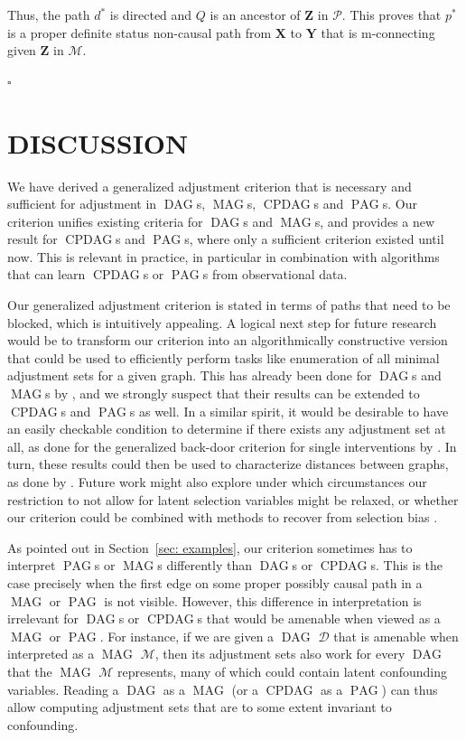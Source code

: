 \documentclass[]{article}
\DeclareMathOperator{\CPDAG}{CPDAG}
\DeclareMathOperator{\DAG}{DAG}
\DeclareMathOperator{\MAG}{MAG}
\DeclareMathOperator{\PAG}{PAG}
\theoremstyle{definition}
\newenvironment{proofof}[1][]{\begin{trivlist}
   \item[\hskip \labelsep {\bfseries Proof of #1.}]}{\end{trivlist} \hfill $\square$}
\theoremstyle{remark}
\newcommand{\g}[1][G]{\mathcal{#1}}
\newcommand{\pstar}[1][p]{{#1}^{*}}
\begin{document}
\begin{proofof}[Lemma \ref{lemma22}]
 Thus, the path $\pstar[d]$ is directed and $Q$ is an ancestor of $\mathbf{Z}$ in $\g[P]$. This proves that $\pstar$ is a proper definite status non-causal path from $\mathbf{X}$ to $\mathbf{Y}$ that is m-connecting given $\mathbf{Z}$ in $\g[M]$.
\end{proofof}

\section{DISCUSSION}

We have derived a generalized adjustment criterion that is necessary and sufficient for adjustment in $\DAG$s,
$\MAG$s, $\CPDAG$s and $\PAG$s. Our criterion unifies existing criteria for $\DAG$s and $\MAG$s, and provides a new result
for $\CPDAG$s and $\PAG$s, where only a sufficient criterion existed until now. This is relevant in practice,
in particular in combination with algorithms that can learn $\CPDAG$s or $\PAG$s from observational data.


Our generalized adjustment criterion is stated in terms of paths that need
to be blocked, which is intuitively appealing. A
logical next step for future research would be to transform
our criterion into an algorithmically constructive version that
could be used to efficiently perform tasks like enumeration
of all minimal adjustment sets for a given graph. This has already
been done for $\DAG$s and $\MAG$s by \citet{vanconstructing},
and we strongly suspect that their results can be extended
to $\CPDAG$s and $\PAG$s as well. In a similar spirit, it would be desirable to
have an easily checkable condition to determine if there exists any adjustment
set at all, as done for the generalized back-door criterion for single interventions by \citet{maathuis2013generalized}.
In turn, these results could then be used to characterize distances between graphs, as done by \citet{Peters2014neco}.
Future work might also explore
under which circumstances our restriction
to not allow for latent selection variables might be relaxed,
or whether our criterion could be combined with methods to
recover from selection bias \citep{Bareinboim2014}.


As pointed out in Section~\ref{sec: examples}, our criterion sometimes has to interpret
$\PAG$s or $\MAG$s differently than $\DAG$s or $\CPDAG$s.
This is the case precisely when the first edge on some proper
possibly
causal path in a $\MAG$ or $\PAG$ is not visible.
However, this difference in interpretation
is irrelevant for $\DAG$s or $\CPDAG$s that would be
amenable when viewed as a $\MAG$ or $\PAG$.
For instance, if we are given a $\DAG$ $\g[D]$
that is amenable when interpreted as a $\MAG$ $\g[M]$,
then its
adjustment sets also work for every $\DAG$ that the $\MAG$ $\g[M]$
represents, many of which could contain
latent confounding variables. Reading a $\DAG$ as a $\MAG$
(or a $\CPDAG$ as a $\PAG$) can thus allow computing adjustment
sets that are to some extent invariant to confounding.
\end{document}
